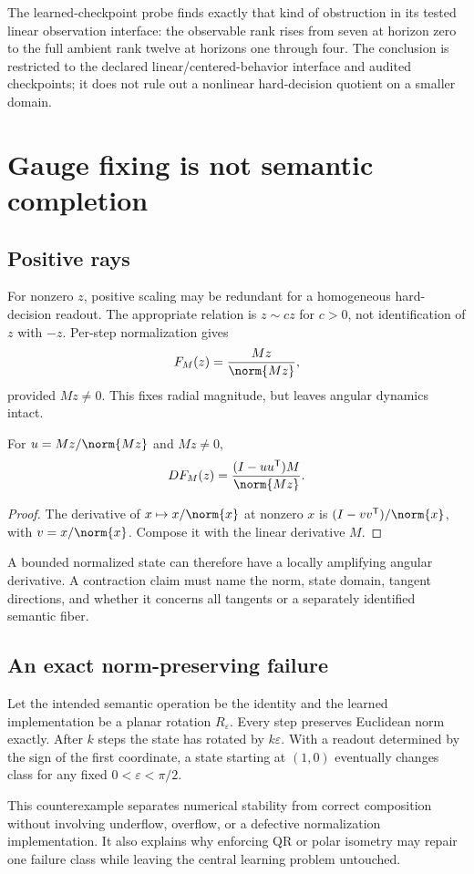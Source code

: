 \documentclass[11pt]{article}
\begin{document}
The learned-checkpoint probe finds exactly that kind of obstruction in its tested linear observation interface: the observable rank rises from seven at horizon zero to the full ambient rank twelve at horizons one through four. The conclusion is restricted to the declared linear/centered-behavior interface and audited checkpoints; it does not rule out a nonlinear hard-decision quotient on a smaller domain. \cite{nlp}

\section{Gauge fixing is not semantic completion}
\subsection{Positive rays}
For nonzero \(z\), positive scaling may be redundant for a homogeneous hard-decision readout. The appropriate relation is \(z\sim cz\) for \(c>0\), not identification of \(z\) with \(-z\). Per-step normalization gives
\[
 F_M(z)=\frac{Mz}{\norm{Mz}},
\]
provided \(Mz\ne0\). This fixes radial magnitude, but leaves angular dynamics intact.

\begin{proposition}\label{prop:derivative}
For \(u=Mz/\norm{Mz}\) and \(Mz\ne0\),
\[
 DF_M(z)=\frac{(I-uu^{\mathsf T})M}{\norm{Mz}}.
\]
\end{proposition}
\begin{proof}
The derivative of \(x\mapsto x/\norm{x}\) at nonzero \(x\) is \((I-vv^{\mathsf T})/\norm{x}\), with \(v=x/\norm{x}\). Compose it with the linear derivative \(M\).
\end{proof}
A bounded normalized state can therefore have a locally amplifying angular derivative. A contraction claim must name the norm, state domain, tangent directions, and whether it concerns all tangents or a separately identified semantic fiber.

\subsection{An exact norm-preserving failure}
\begin{counterexample}\label{ex:rotation}
Let the intended semantic operation be the identity and the learned implementation be a planar rotation \(R_\varepsilon\). Every step preserves Euclidean norm exactly. After \(k\) steps the state has rotated by \(k\varepsilon\). With a readout determined by the sign of the first coordinate, a state starting at \((1,0)\) eventually changes class for any fixed \(0<\varepsilon<\pi/2\).
\end{counterexample}
This counterexample separates numerical stability from correct composition without involving underflow, overflow, or a defective normalization implementation. It also explains why enforcing QR or polar isometry may repair one failure class while leaving the central learning problem untouched.
\end{document}
